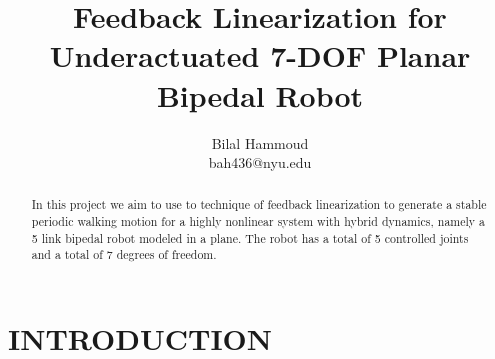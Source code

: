 \documentclass[letterpaper, 10 pt, conference]{ieeeconf}  %
\title{\LARGE \bf
Feedback Linearization for Underactuated 7-DOF Planar Bipedal Robot}
\author{Bilal Hammoud \\ bah436@nyu.edu}
\begin{document}
\maketitle
\thispagestyle{empty}
\pagestyle{empty}


\begin{abstract}
  In this project we aim to use to technique of feedback linearization to generate a stable periodic walking motion for a highly nonlinear system with hybrid dynamics, namely a 5 link bipedal robot modeled in a plane. The robot has a total of 5 controlled joints and a total of 7 degrees of freedom.
 
\end{abstract}


\section{INTRODUCTION}
\end{document}
